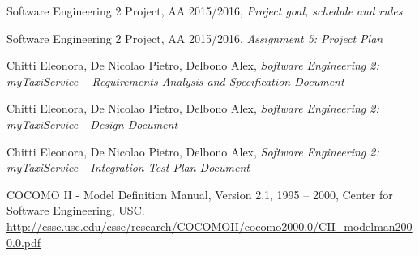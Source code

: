 \begin{thebibliography}{10}
        Software Engineering 2 Project, AA 2015/2016, \emph{Project goal, schedule and rules}

        Software Engineering 2 Project, AA 2015/2016, \emph{Assignment 5: Project Plan}

        Chitti Eleonora, De Nicolao Pietro, Delbono Alex,
        \emph{Software Engineering 2: myTaxiService –
        Requirements Analysis and Specification Document}

        Chitti Eleonora, De Nicolao Pietro, Delbono Alex, \emph{Software Engineering 2: myTaxiService - Design Document}

        Chitti Eleonora, De Nicolao Pietro, Delbono Alex, \emph{Software Engineering 2: myTaxiService - Integration Test Plan Document}

    COCOMO II - Model Definition Manual, Version 2.1, 1995 – 2000, Center for Software Engineering, USC.
    \url{http://csse.usc.edu/csse/research/COCOMOII/cocomo2000.0/CII_modelman2000.0.pdf}
\end{thebibliography}
